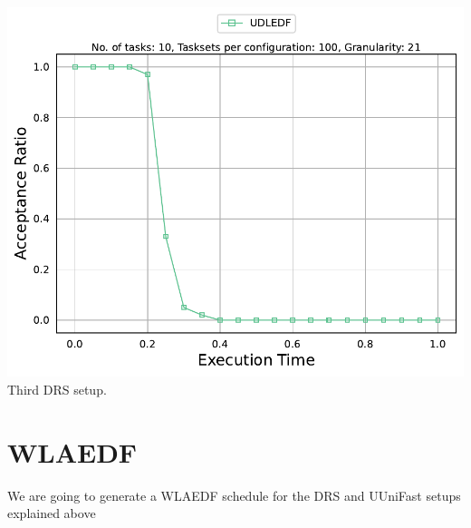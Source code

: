 \documentclass[]{article}
\begin{document}
\begin{minipage}[t]{0.48\linewidth}
		\includegraphics[width=\linewidth]{UDLEDF_3rdSetup_DRS.pdf}
		Third DRS setup.
		\vspace{0.3cm}
	\end{minipage}


	\clearpage
	\section{WLAEDF}
{
\raggedleft We are going to generate a WLAEDF schedule for the DRS and UUniFast setups explained above \newline
}
\end{document}
